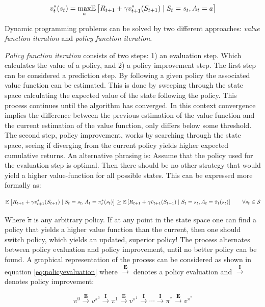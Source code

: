 \begin{equation}
    v_t^{*}(s_t) = \underset{a}{\max}  \mathbb{E} \left[ R_{t+1} + \gamma v^{*}_{t+1}(S_{t+1}) \mid S_t = s_t, A_t = a\right] 
\end{equation}

Dynamic programming problems can be solved by two different approaches: \textit{value function iteration} and \textit{policy function iteration}.

\textit{Policy function iteration} consists of two steps: 1) an evaluation step. Which calculates the value of a policy, and 2) a policy improvement step.
The first step can be considered a prediction step. By following a given policy the associated value function can be estimated. This is done by sweeping through the state space calculating the expected value of the state following the policy. This process continues until the algorithm has converged. In this context convergence implies the difference between the previous estimation of the value function and the current estimation of the value function, only differs below some threshold. The second step, policy improvement, works by searching through the state space, seeing if diverging from the current policy yields higher expected cumulative returns. An alternative phrasing is: Assume that the policy used for the evaluation step is optimal. Then there should be no other strategy that would yield a higher value-function for all possible states. This can be expressed more formally as:

\begin{equation}
     \mathbb{E} \left[ R_{t+1} + \gamma v^{*}_{t+1}(S_{t+1}) \mid S_t = s_t, A_t = \pi_t^*(s_t) \right] \geq \mathbb{E} \left[ R_{t+1} + \gamma \tilde{v}_{t+1}(S_{t+1}) \mid S_t = s_t, A_t =\tilde{\pi}_t(s_t) \right] \qquad \forall s_t \in \mathcal{S}
\end{equation}

Where $\tilde{\pi}$ is any arbitrary policy. If at any point in the state space one can find a policy that yields a higher value function than the current, then one should switch policy, which yields an updated, superior policy! The process alternates between policy evaluation and policy improvement, until no better policy can be found. A graphical representation of the process can be considered as shown in equation \eqref{eq:policyevaluation} where $\overset{\textbf{E}}{\longrightarrow}$ denotes a policy evaluation and $\overset{\textbf{I}}{\longrightarrow}$ denotes policy improvement:

\begin{equation}
    \label{eq:policyevaluation}
    \pi^0 \overset{\textbf{E}}{\longrightarrow}
    v^{\pi^0} \overset{\textbf{I}}{\longrightarrow} \pi^1 \overset{\textbf{E}}{\longrightarrow} v^{\pi^1} \overset{\textbf{I}}{\longrightarrow} \cdots \overset{\textbf{I}}{\longrightarrow} \pi^* \overset{\textbf{E}}{\longrightarrow} v^{\pi^*}
\end{equation}

